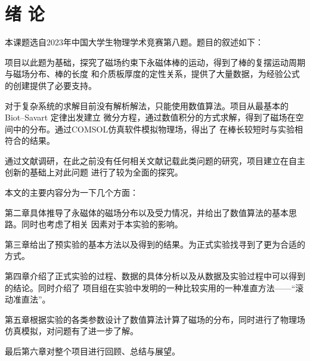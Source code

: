 \documentclass[AutoFakeBold]{LZUThesis}
\begin{document}
\mainmatter

\chapter{\texorpdfstring{绪 \quad 论}{绪论}}
本课题选自2023年中国大学生物理学术竞赛第八题。题目的叙述如下：
\begin{center}
\end{center}
项目以此题为基础，探究了磁场约束下永磁体棒的运动，得到了棒的复摆运动周期与磁场分布、棒的长度
和介质板厚度的定性关系，提供了大量数据，为经验公式的创建提供了必要支持。

对于复杂系统的求解目前没有解析解法，只能使用数值算法。项目从最基本的Biot–Savart 定律出发建立
微分方程，通过数值积分的方式求解，得到了磁场在空间中的分布。通过COMSOL仿真软件模拟物理场，得出了
在棒长较短时与实验相符合的结果。

通过文献调研，在此之前没有任何相关文献记载此类问题的研究，项目建立在自主创新的基础上对此问题
进行了较为全面的探究。

本文的主要内容分为一下几个方面：

第二章具体推导了永磁体的磁场分布以及受力情况，并给出了数值算法的基本思路。同时也考虑了相关
因素对于本实验的影响。

第三章给出了预实验的基本方法以及得到的结果。为正式实验找寻到了更为合适的方式。

第四章介绍了正式实验的过程、数据的具体分析以及从数据及实验过程中可以得到的结论。同时介绍了
项目组在实验中发明的一种比较实用的一种准直方法——“滚动准直法”。

第五章根据实验的各类参数设计了数值算法计算了磁场的分布，同时进行了物理场仿真模拟，对问题有了进一步了解。

最后第六章对整个项目进行回顾、总结与展望。
\end{document}
